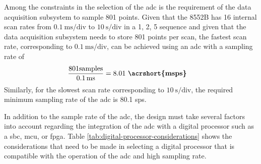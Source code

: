 \documentclass[class=report,11pt,crop=false]{standalone}
\begin{document}
	Among the constraints in the selection of the \acrshort{adc} is the requirement of the data acquisition subsystem to sample 801 points. Given that the 8552B has 16 internal scan rates from $\SI{0.1}{\milli\second}/\text{div}$ to $\SI{10}{\second}/\text{div}$ in a 1, 2, 5 sequence and given that the data acquisition subsystem needs to store 801 points per scan, the fastest scan rate, corresponding to $\SI{0.1}{\milli\second}/\text{div}$, can be achieved using an \acrshort{adc} with a sampling rate of 
	\begin{align}
		\frac{801\text{samples}}{\SI{0.1}{\milli\second}}	& = 8.01~\textbf{\acrshort{msps}}\nonumber
	\end{align}
	Similarly, for the slowest scan rate corresponding to $\SI{10}{\second}/\text{div}$, the required minimum sampling rate of the \acrshort{adc} is 80.1 \acrshort{sps}.
	
	In addition to the sample rate of the \acrshort{adc}, the design must take several factors into account regarding the integration of the \acrshort{adc} with a digital processor such as a \acrshort{sbc}, \acrshort{mcu}, or \acrshort{fpga}. Table \ref{tab:digital-processor-considerations} shows the considerations that need to be made in selecting a digital processor that is compatible with the operation of the \acrshort{adc} and high sampling rate.
	
\end{document}
